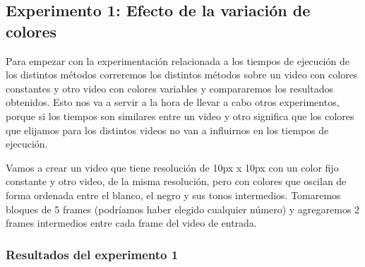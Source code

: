 \subsection{Experimento 1: Efecto de la variaci\'on de colores}
\par Para empezar con la experimentaci\'on relacionada a los tiempos de ejecuci\'on de los distintos m\'etodos correremos los distintos m\'etodos sobre un video con colores constantes y otro video con colores variables y compararemos los resultados obtenidos. Esto nos va a servir a la hora de llevar a cabo otros experimentos, porque si los tiempos son similares entre un video y otro significa que los colores que elijamos para los distintos videos no van a influirnos en los tiempos de ejecuci\'on.

\par Vamos a crear un video que tiene resoluci\'on de 10px x 10px con un color fijo constante y otro video, de la misma resoluci\'on, pero con colores que oscilan de forma ordenada entre el blanco, el negro y sus tonos intermedios. Tomaremos bloques de 5 frames (podr\'iamos haber elegido cualquier n\'umero) y agregaremos 2 frames intermedios entre cada frame del video de entrada.


\subsubsection{Resultados del experimento 1}

